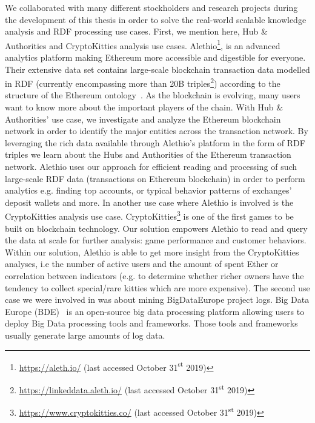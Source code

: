 \begin{enumerate}
    We collaborated with many different stockholders and research projects during the development of this thesis in order to solve the real-world scalable knowledge analysis and \gls{RDF} processing use cases.
    First, we mention here, Hub \& Authorities and CryptoKitties analysis use cases. 
    Alethio\footnote{\scriptsize \url{https://aleth.io/} (last accessed October 31{\textsuperscript{st}} 2019)}, is an advanced analytics platform making Ethereum more accessible and digestible for everyone.
    Their extensive data set contains large-scale blockchain transaction data modelled in \gls{RDF} (currently encompassing more than 20B triples\footnote{\scriptsize \url{https://linkeddata.aleth.io/} (last accessed October 31{\textsuperscript{st}} 2019)}) according to the structure of the Ethereum ontology~\cite{pfeffer2016ethon}.
    As the blockchain is evolving, many users want to know more about the important players of the chain. 
    With Hub \& Authorities' use case, we investigate and analyze the Ethereum blockchain network in order to identify the major entities across the transaction network. 
    By leveraging the rich data available through Alethio's platform in the form of \gls{RDF} triples we learn about the Hubs and Authorities of the Ethereum transaction network.
    Alethio uses our approach for efficient reading and processing of such large-scale \gls{RDF} data (transactions on Ethereum blockchain) in order to perform analytics e.g. finding top accounts, or typical behavior patterns of exchanges' deposit wallets and more.
    In another use case where Alethio is involved is the CryptoKitties analysis use case.
    CryptoKitties\footnote{\scriptsize \url{https://www.cryptokitties.co/} (last accessed October 31{\textsuperscript{st}} 2019)} is one of the first games to be built on blockchain technology.
    Our solution empowers Alethio to read and query the data at scale for further analysis: game performance and customer behaviors.
    Within our solution, Alethio is able to get more insight from the CryptoKitties analyses, i.e the number of active users and the amount of spent Ether or correlation between indicators (e.g. to determine whether richer owners have the tendency to collect special/rare kitties which are more expensive).
    The second use case we were involved in was about mining BigDataEurope project logs.
    Big Data Europe (BDE)~\cite{Auer+ICWE-2017} is an open-source big data processing platform allowing users to deploy Big Data processing tools and frameworks. 
    Those tools and frameworks usually generate large amounts of log data. 

\end{enumerate}
